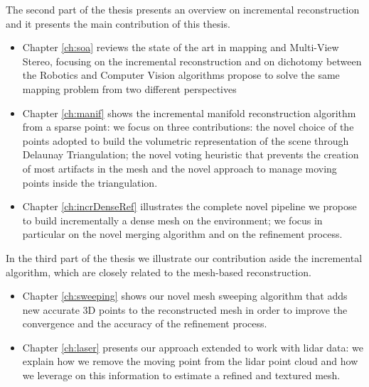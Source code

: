 The second part of the thesis presents an overview on incremental reconstruction and it presents the main contribution of this thesis.
\begin{itemize}
 \item Chapter \ref{ch:soa} reviews the state of the art in mapping and Multi-View Stereo, focusing on the incremental reconstruction and on dichotomy between the Robotics and  Computer Vision algorithms propose to solve the same mapping problem from two different perspectives
 \item Chapter \ref{ch:manif} shows the incremental manifold reconstruction algorithm from a sparse point:  we focus on three contributions: the novel choice of the points adopted to build the volumetric representation of the scene through Delaunay Triangulation; the novel voting heuristic that prevents the creation of most artifacts in the mesh and the novel approach to manage moving points inside the triangulation.
 \item Chapter \ref{ch:incrDenseRef} illustrates the complete novel pipeline we propose to build incrementally a dense mesh on the environment; we focus in particular on the novel merging algorithm and on the refinement process.
\end{itemize}

In the third part of the thesis we illustrate our contribution aside the incremental algorithm, which are closely related to the mesh-based reconstruction.

\begin{itemize}
 \item Chapter \ref{ch:sweeping} shows our novel mesh sweeping algorithm that adds new accurate 3D points to the reconstructed mesh in order to  improve the convergence and the accuracy of the refinement process.
 \item Chapter \ref{ch:laser} presents our approach extended to work with lidar data: we explain how we remove the moving point from the lidar point cloud and how we leverage on this information to estimate a refined and textured mesh.
\end{itemize}















